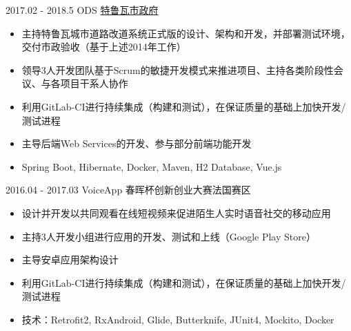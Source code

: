 \documentclass[letterpaper]{twentysecondcv} %
\begin{document}
\begin{twentyfluid}

    \twentyitemfluid
   		{2017.02 - 2018.5}
        {ODS}
        {\href{https://www.ville-troyes.fr/}{特鲁瓦市政府}}
        {\\   }
        {
        {
        \vspace{-0.2cm}
        \begin{itemize}
        	\item 主持特鲁瓦城市道路改道系统正式版的设计、架构和开发，并部署测试环境，交付市政验收（基于上述2014年工作）
        	\item 领导3人开发团队基于Scrum的敏捷开发模式来推进项目、主持各类阶段性会议、与各项目干系人协作
        	\item 利用GitLab-CI进行持续集成（构建和测试），在保证质量的基础上加快开发/测试进程
            \item 主导后端Web Services的开发、参与部分前端功能开发
        	\item Spring Boot, Hibernate, Docker, Maven, H2 Database, Vue.js
    	\end{itemize}}
        }
    
    \twentyitemfluid
    	{2016.04 - 2017.03}
        {VoiceApp}
        {春晖杯创新创业大赛法国赛区}
        {\\   }
        {
        {
        \vspace{-0.2cm}
        \begin{itemize}
        	\item 设计并开发以共同观看在线短视频来促进陌生人实时语音社交的移动应用
            \item 主持3人开发小组进行应用的开发、测试和上线（Google Play Store）
            \item 主导安卓应用架构设计
            \item 利用GitLab-CI进行持续集成（构建和测试），在保证质量的基础上加快开发/测试进程
            \item 技术：Retrofit2, RxAndroid, Glide, Butterknife, JUnit4, Mockito, Docker
        \end{itemize}}
        }

\end{twentyfluid}
\end{document}
